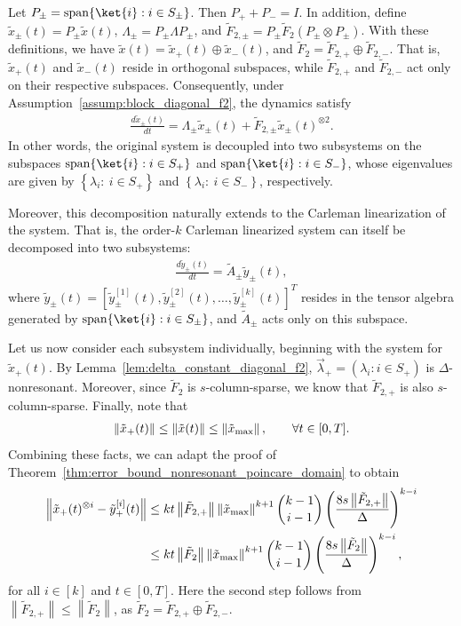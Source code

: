 \documentclass[superscriptaddress,onecolumn,nofootinbib,longbibliography,a4paper,accepted=2026-09-29]{quantumarticle}
\theoremstyle{plain}
\theoremstyle{definition}
\numberwithin{thm}{section}
\numberwithin{assumption}{section}
\numberwithin{lemma}{section}
\numberwithin{prop}{section}
\numberwithin{cor}{section}
\numberwithin{definition}{section}
\numberwithin{rmk}{section}
\numberwithin{equation}{section}
\newcommand{\norm}[1]     {\left\| #1 \right\|}
\newcommand{\lrb}[1]{\left ( #1 \right )}
\newcommand{\lrcb}[1]{\left \{ #1 \right \}}
\begin{document}
Let $P_{\pm} = \operatorname{span}\{\ket{i} : i \in S_{\pm}\}$. Then $P_+ + P_- = I$. In addition, define $\tilde{x}_{\pm}(t) = P_{\pm} \tilde{x}(t)$, $\Lambda_{\pm} = P_{\pm} \Lambda P_{\pm}$, and $\tilde{F}_{2,\pm} = P_{\pm} \tilde{F}_2 (P_{\pm} \otimes P_{\pm})$. With these definitions, we have $\tilde{x}(t) = \tilde{x}_+(t) \oplus \tilde{x}_-(t)$, and $\tilde{F}_2=\tilde{F}_{2,+} \oplus \tilde{F}_{2,-}$. That is,  
$\tilde{x}_+(t)$ and $\tilde{x}_-(t)$ reside in orthogonal subspaces, while
$\tilde{F}_{2,+}$ and $\tilde{F}_{2,-}$ act only on their respective subspaces. Consequently, under Assumption~\ref{assump:block_diagonal_f2}, the dynamics satisfy
\begin{align}
    \frac{d \tilde{x}_\pm(t)}{dt} = \Lambda_{\pm} \tilde{x}_{\pm}(t) + \tilde{F}_{2,\pm}  \tilde{x}_{\pm}(t)^{\otimes 2}.
    \label{eq:decoupled_subsystems}
\end{align}
In other words, the original system is decoupled into two subsystems on the subspaces $\operatorname{span}\{\ket{i} : i \in S_+\}$ and $\operatorname{span}\{\ket{i} : i \in S_-\}$, whose eigenvalues are given by $\lrcb{\lambda_i: ~i \in S_+}$ and $\lrcb{\lambda_i:~i \in S_-}$, respectively. 

Moreover, this decomposition naturally extends to the Carleman linearization of the system. That is, the order-$k$ Carleman linearized system can itself be decomposed into two subsystems:
\begin{align}
\frac{d\tilde{y}_{\pm}(t)}{dt} = \tilde{A}_{\pm} \tilde{y}_{\pm}(t),
\end{align}
where $\tilde{y}_{\pm}(t)=[\tilde{y}^{[1]}_{\pm}(t), \tilde{y}^{[2]}_{\pm}(t), \dots, \tilde{y}^{[k]}_{\pm}(t)]^T$ resides in the tensor algebra generated by $\operatorname{span}\{\ket{i} : i \in S_\pm\}$, and $\tilde{A}_{\pm}$ acts only on this subspace.


Let us now consider each subsystem individually, beginning with the system for $\tilde{x}_+(t)$. By Lemma~\ref{lem:delta_constant_diagonal_f2}, $\vec\lambda_+=(\lambda_i : i \in S_+)$ is $\Delta$-nonresonant. Moreover, since $\tilde{F}_2$ is $s$-column-sparse, we know that $\tilde{F}_{2,+}$ is also $s$-column-sparse. Finally, note that 
\begin{align}
\norm{\tilde{x}_+(t)} \le \norm{\tilde{x}(t)} \le \norm{\tilde{x}_{\rm max}}, \qquad \forall t \in [0, T].
\end{align}
Combining these facts, we can adapt the proof of Theorem~\ref{thm:error_bound_nonresonant_poincare_domain} to obtain
\begin{align}
\norm{\tilde{x}_+(t)^{\otimes i}-\tilde{y}^{[i]}_+(t)} &\le  k t  \norm{\tilde{F}_{2,+}} \norm{\tilde{x}_{\rm max}}^{k+1} \binom{k-1}{i-1} \lrb{\frac{8 s\norm{\tilde{F}_{2,+}} }{\Delta}}^{k-i} \\
&\le  k t  \norm{\tilde{F}_{2}} \norm{\tilde{x}_{\rm max}}^{k+1} \binom{k-1}{i-1} \lrb{\frac{8 s\norm{\tilde{F}_{2}} }{\Delta}}^{k-i},
\end{align}
for all $i \in [k]$ and $t \in [0, T]$. Here the second step follows from $\norm{\tilde{F}_{2,+}} \le \norm{\tilde{F}_{2}}$, as $\tilde{F}_2=\tilde{F}_{2,+} \oplus \tilde{F}_{2,-}$.
\end{document}
